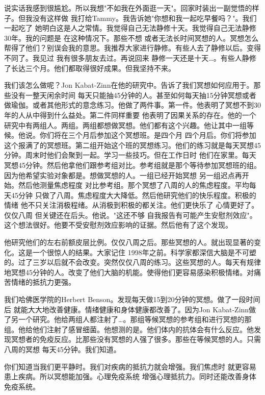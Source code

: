 说实话我感到很尴尬。所以我想"不如我在外面逛一天"。回家时装出一副觉悟的样子。但我没有这样做 我打给Tammy。我告诉她"你想和我一起吃早餐吗？"。我们一起吃了 她明白这是人之常情。我觉得自己无法静修十天。我觉得自己无法静修30年。我的问题是 在这种情况下。那些不想 或者无法长时间冥想的人。冥想怎么帮得了他们？别误会我的意思。我推荐大家进行静修。有些人去了静修以后。变得不同了。我见过 我有很多朋友去过。再说回来 静修一天还是十天…。有些人静修了长达三个月。他们都取得很好成果。但我坚持不来。 

我们该怎么做呢？Jon Kabat-Zinn在他的研究中。告诉了我们冥想如何应用于。那些没有一整天闲余时间 每天只能抽45分钟的人。甚至如何每天抽15分钟冥想或者做瑜伽。或者其他形式的意念练习。他做了两件事。第一件。他表明了冥想不到30年的人从中得到什么益处。第二件同样重要 他表明了因果关系的存在。他的一个研究中有两组人。两组。两组都想做冥想。他们都有这个兴趣。他让其中一组等候。他说。你们将在三个月后参加这个冥想班。是四个月 四个月后。你们将参加这个报满了的冥想班。第二组开始这个班的冥想练习。他们的练习就是每天冥想45分钟。周末时他们会聚到一起。学习一些技巧。但在工作日时 他们在家里。每天冥想45分钟。然后他拿他们跟参考组对比。参考组就是那个等待参加冥想班的组。因为他希望实验对象都是。想做冥想的人。一组已经开始冥想 另一组迟点再开始。然后他测量焦虑程度 对比参考组。那个冥想了八周的人的焦虑程度。平均每天45分钟 只做了八周。焦虑程度大大降低。然后他研究他们的快乐程度。积极的情绪 他不只关注消极程绪。从消极到积极的都关注。他们更快乐了 心情更好了。仅仅八周 但关键还在后头。他说。"这还不够 自我报告有可能产生安慰剂效应"。这个想法很好。他要不受安慰剂效应影响的证据。然后他有了这个发现。 

他研究他们的左右前额皮层比例。仅仅八周之后。那些冥想的人。就出现显著的变化。这是一个很惊人的结果。大家记住 1998年之前。科学家都深信大脑是不可塑的。过了三岁以后就不会改变。突然仅仅八周的练习。这些冥想的人。每天有规律地冥想45分钟的人。改变了他们大脑的机能。使得他们更容易感染积极情绪。对痛苦情绪的抵抗力更强。 

我们哈佛医学院的Herbert Benson。发现每天做15到20分钟的冥想。做了一段时间后 就能大大地改善健康。情绪健康和身体健康都改善了。因为Jon Kabat-Zinn做了另一个研究。他给两组人都注射了…。那组等候冥想的参考组和进行冥想的那组。他给他们注射了感冒细菌。他想测的是。他们体内的抗体会有什么反应。他发现冥想者的免疫反应。比那些没有冥想的人强了很多。那些在等候冥想的人。只需八周的冥想 每天45分钟。我们知道。 

你们知道当我们更平静时。我们对疾病的抵抗力就会增强。我们焦虑时 就更容易患上疾病。所以冥想能加强。心理免疫系统 增强心理抵抗力。同时还能改善身体免疫系统。 

